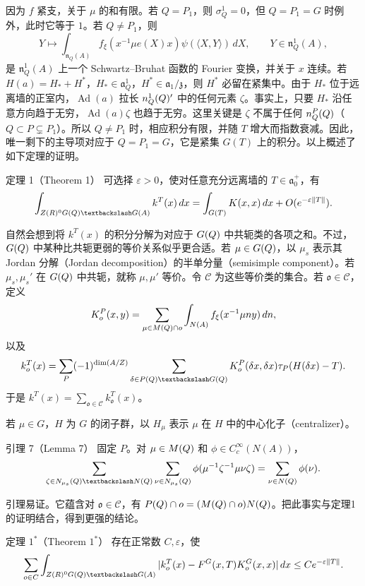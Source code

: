 因为 $f$ 紧支，关于 $\mu$ 的和有限。若 $Q=P_1$，则 $\sigma_Q^1=0$，但 $Q=P_1=G$ 时例外，此时它等于 $1$。若 $Q\ne P_1$，则
\[
 Y\longmapsto\int_{\mathfrak n_Q(A)}f_\xi(x^{-1}\mu e(X)x)
 \psi(\langle X,Y\rangle)\,dX,\qquad Y\in\mathfrak n_Q^1(A),
\]
是 $\mathfrak n_Q^1(A)$ 上一个 Schwartz--Bruhat 函数的 Fourier 变换，并关于 $x$ 连续。若
$H(a)=H_*+H^*$，$H_*\in\mathfrak a_Q^1$，$H^*\in\mathfrak a_1/\mathfrak z$，则 $H^*$ 必留在紧集中。由于 $H_*$ 位于远离墙的正室内，$\operatorname{Ad}(a)$ 拉长
$n_Q^1(Q)'$ 中的任何元素 $\zeta$。事实上，只要 $H_*$ 沿任意方向趋于无穷，$\operatorname{Ad}(a)\zeta$ 也趋于无穷。这里关键是 $\zeta$ 不属于任何
$n_Q^P(Q)$（$Q\subset P\subsetneq P_1$）。所以 $Q\ne P_1$ 时，相应积分有限，并随 $T$ 增大而指数衰减。因此，唯一剩下的主导项对应于
$Q=P_1=G$，它是紧集 $G(T)$ 上的积分。以上概述了如下定理的证明。

\begin{originaltheorem}{定理 1（Theorem 1）}
可选择 $\varepsilon>0$，使对任意充分远离墙的 $T\in\mathfrak a_0^+$，有
\[
 \int_{Z(\R)^0G(\Q)\backslash G(A)}k^T(x)\,dx
 =\int_{G(T)}K(x,x)\,dx+O(e^{-\varepsilon\|T\|}).
\]
\end{originaltheorem}

自然会想到将 $k^T(x)$ 的积分分解为对应于 $G(Q)$ 中共轭类的各项之和。不过，$G(Q)$ 中某种比共轭更弱的等价关系似乎更合适。若 $\mu\in G(Q)$，以 $\mu_s$ 表示其 Jordan 分解（Jordan decomposition）的半单分量（semisimple component）。若 $\mu_s,\mu_s'$ 在 $G(Q)$ 中共轭，就称 $\mu,\mu'$ 等价。令 $\mathcal C$ 为这些等价类的集合。若 $\mathfrak o\in\mathcal C$，定义
\[
 K_o^P(x,y)=\sum_{\mu\in M(Q)\cap o}
 \int_{N(A)}f_\xi(x^{-1}\mu ny)\,dn,
\]
以及
\[
 k_\mathfrak o^T(x)=\sum_P(-1)^{\dim(A/Z)}
 \sum_{\delta\in P(\Q)\backslash G(\Q)}K_\mathfrak o^P(\delta x,\delta x)
 \widehat\tau_P(H(\delta x)-T).
\]
于是 $k^T(x)=\sum_{\mathfrak o\in\mathcal C}k_\mathfrak o^T(x)$。

若 $\mu\in G$，$H$ 为 $G$ 的闭子群，以 $H_\mu$ 表示 $\mu$ 在 $H$ 中的中心化子（centralizer）。
\begin{originaltheorem}{引理 7（Lemma 7）}
固定 $P$。对 $\mu\in M(Q)$ 和 $\phi\in C_c^\infty(N(A))$，
\[
 \sum_{\zeta\in N_{\mu_s}(\Q)\backslash N(\Q)}
 \sum_{\nu\in N_{\mu_s}(\Q)}
 \phi(\mu^{-1}\zeta^{-1}\mu\nu\zeta)=\sum_{\nu\in N(\Q)}\phi(\nu).
\]
\end{originaltheorem}
引理易证。它蕴含对 $\mathfrak o\in\mathcal C$，有
$P(Q)\cap o=(M(Q)\cap o)N(Q)$。把此事实与定理1的证明结合，得到更强的结论。
\begin{originaltheorem}{定理 $1^*$（Theorem $1^*$）}
存在正常数 $C,\varepsilon$，使
\[
 \sum_{\mathfrak o\in\mathcal C}\int_{Z(\R)^0G(\Q)\backslash G(A)}
 |k_\mathfrak o^T(x)-F^G(x,T)K_\mathfrak o^G(x,x)|\,dx
 \le Ce^{-\varepsilon\|T\|}.
\]
\end{originaltheorem}

